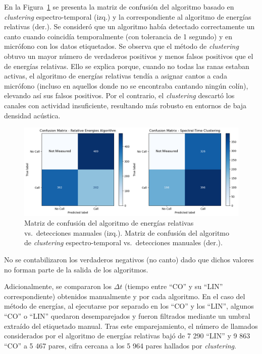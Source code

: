 En la Figura~\ref{fig:conf_mat_energies_cluster} se presenta la matriz de 
confusión del algoritmo basado en \textit{clustering} espectro-temporal (izq.) y 
la correspondiente al algoritmo de energías relativas (der.). 
Se consideró que un algoritmo había detectado correctamente un canto
cuando coincidía temporalmente (con tolerancia de 1 segundo) y en micrófono con los datos etiquetados.
Se observa 
que el método de \textit{clustering} obtuvo un mayor número de verdaderos 
positivos y menos falsos positivos que el de energías relativas. 
Ello se explica porque, cuando no todas las ranas estaban 
activas, el algoritmo de energías relativas tendía a asignar 
cantos a cada micrófono (incluso en aquellos donde no se encontraba cantando
ningún colín), elevando así sus falsos positivos. Por el 
contrario, el \textit{clustering} descartó los canales con actividad 
insuficiente, resultando más robusto en entornos de baja 
densidad acústica.  

\begin{figure}[ht]
  \centering
  \includegraphics[width=\columnwidth]{Graphics/confusion_matrix_clustering_energies.png}
  \caption{Matriz de confusión del algoritmo de energías relativas vs.\ detecciones manuales (izq.). Matriz de confusión del algoritmo de \textit{clustering} espectro-temporal vs.\ detecciones manuales (der.).}
  \label{fig:conf_mat_energies_cluster}
\end{figure}



No se contabilizaron los verdaderos negativos (no canto) dado 
que dichos valores no forman parte de la salida de los 
algoritmos.  

Adicionalmente, se compararon los \(\Delta t\) (tiempo entre 
“CO” y su “LIN” correspondiente) obtenidos manualmente y por 
cada algoritmo. En el caso del método de energías, al ejecutarse
por separado en los “CO” y los “LIN”, algunos “CO” 
o “LIN” quedaron desemparejados y fueron filtrados mediante un 
umbral extraído del etiquetado manual. Tras este emparejamiento, 
el número de llamados considerados por el algoritmo de energías 
relativas bajó de 7 290 “LIN” y 9 863 “CO” a 5 467 pares, cifra 
cercana a los 5 964 pares hallados por \textit{clustering}.  

